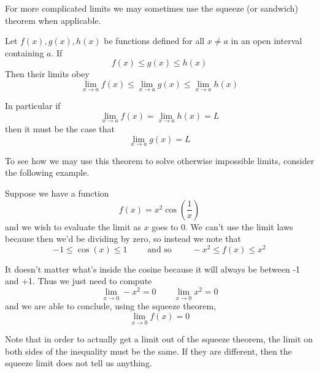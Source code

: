 For more complicated limits we may sometimes use the squeeze (or sandwich) theorem when applicable.
\begin{theorem}
	Let $f(x), g(x), h(x)$ be functions defined for all $x \neq a$ in an open interval containing $a$. If
	\[ f(x) \leq g(x) \leq h(x) \]
	Then their limits obey
	\[ \lim_{x \to a} f(x) \leq \lim_{x \to a} g(x) \leq \lim_{x \to a} h(x) \]
	
	In particular if
	\[ \lim_{x \to a} f(x) = \lim_{x \to a} h(x) = L \]
	then it must be the case that
	\[ \lim_{x \to a} g(x) = L \]
\end{theorem}

To see how we may use this theorem to solve otherwise impossible limits, consider the following example.

\begin{example}
	Suppose we have a function
	\[ f(x) = x^2 \cos(\frac{1}{x}) \]
	and we wish to evaluate the limit as $x$ goes to 0. We can't use the limit laws because then we'd be dividing by zero, so instead we note that
	\[ -1 \leq \cos(x) \leq 1 \qquad \text{ and so } \qquad -x^2 \leq f(x) \leq x^2 \]
	
	It doesn't matter what's inside the cosine because it will always be between -1 and +1. Thus we just need to compute
	\[ \lim_{x \to 0} -x^2 = 0 \qquad \lim_{x \to 0} x^2 = 0 \]
	and we are able to conclude, using the squeeze theorem,
	\[ \lim_{x \to 0} f(x) = 0 \]
\end{example}

Note that in order to actually get a limit out of the squeeze theorem, the limit on both sides of the inequality must be the same. If they are different, then the squeeze limit does not tell us anything.

